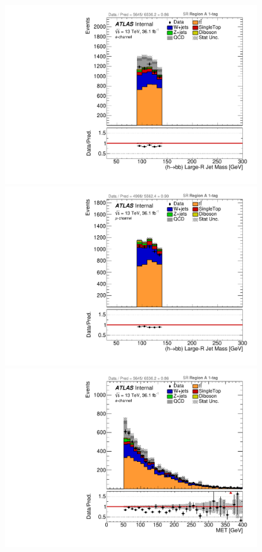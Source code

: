 \begin{figure}[!htbp]
\begin{center}
\includegraphics[scale=0.33]{./figures/boosted/ABCD_1tag0bjet/elec_SR_RegionA_HbbMass_withDD}
\includegraphics[scale=0.33]{./figures/boosted/ABCD_1tag0bjet/muon_SR_RegionA_HbbMass_withDD}\\
\includegraphics[scale=0.33]{./figures/boosted/ABCD_1tag0bjet/elec_SR_RegionA_MET_withDD}  

\end{center}
\end{figure}
